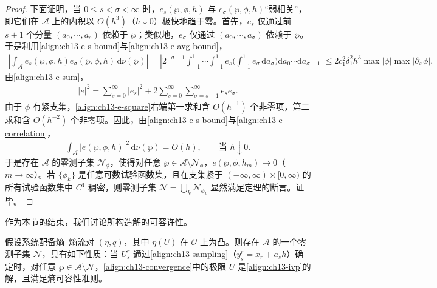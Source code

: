 \documentclass[../../main.tex]{subfiles}
\begin{document}
\begin{proof}
下面证明，当 $0\leqslant s<\sigma<\infty$ 时，$e_s(\wp,\phi,h)$ 与 $e_\sigma(\wp,\phi,h)$``弱相关''，即它们在 $\mathscr{A}$ 上的内积以 $O(h^3)$（$h\downarrow0$）极快地趋于零。首先，$e_s$ 仅通过前 $s+1$ 个分量 $(a_0,\cdots,a_s)$ 依赖于 $\wp$；类似地，$e_\sigma$ 仅通过 $(a_0,\cdots,a_\sigma)$ 依赖于 $\wp$。于是利用\eqref{align:ch13-e-s-bound}与\eqref{align:ch13-e-avg-bound}，
\begin{align}
\left|\int_{\mathscr{A}}e_s(\wp,\phi,h)e_\sigma(\wp,\phi,h)\,\mathrm{d}\nu(\wp)\right|
=\left|2^{-\sigma-1}\int_{-1}^1\cdots\int_{-1}^1 e_s\Big(\int_{-1}^1 e_\sigma\,\mathrm{d}a_\sigma\Big)\mathrm{d}a_0\cdots\mathrm{d}a_{\sigma-1}\right|
\leqslant 2c_1^2\delta_1^2 h^3\max|\phi|\max|\partial_x\phi|.
\label{align:ch13-e-correlation}
\end{align}
由\eqref{align:ch13-e-sum}，
\begin{align}
|e|^2=\sum_{s=0}^\infty|e_s|^2+2\sum_{s=0}^\infty\sum_{\sigma=s+1}^\infty e_s e_\sigma.
\label{align:ch13-e-square}
\end{align}
由于 $\phi$ 有紧支集，\eqref{align:ch13-e-square}右端第一求和含 $O(h^{-1})$ 个非零项，第二求和含 $O(h^{-2})$ 个非零项。因此，由\eqref{align:ch13-e-s-bound}与\eqref{align:ch13-e-correlation}，
\begin{align}
\int_{\mathscr{A}}|e(\wp,\phi,h)|^2\,\mathrm{d}\nu(\wp)=O(h),\qquad\text{当 }h\downarrow0.
\label{align:ch13-e-square-avg}
\end{align}
于是存在 $\mathscr{A}$ 的零测子集 $\mathscr{N}_\phi$，使得对任意 $\wp\in\mathscr{A}\setminus\mathscr{N}_\phi$，$e(\wp,\phi,h_m)\to0$（$m\to\infty$）。若 $\{\phi_k\}$ 是任意可数试验函数集，且在支集紧于 $(-\infty,\infty)\times[0,\infty)$ 的所有试验函数集中 $C^1$ 稠密，则零测子集 $\mathscr{N}=\bigcup_k\mathscr{N}_{\phi_k}$ 显然满足定理的断言。证毕。
\end{proof}

作为本节的结束，我们讨论所构造解的可容许性。

\begin{theorem}[熵可容许性]\label{theorem:ch13-熵可容性}
假设系统配备熵--熵流对 $(\eta,q)$，其中 $\eta(U)$ 在 $\mathcal{O}$ 上为凸。则存在 $\mathscr{A}$ 的一个零测子集 $\mathscr{N}$，具有如下性质：当 $U_s^r$ 通过\eqref{align:ch13-sampling}（$y_s^r=x_r+a_s h$）确定时，对任意 $\wp\in\mathscr{A}\setminus\mathscr{N}$，\eqref{align:ch13-convergence}中的极限 $U$ 是\eqref{align:ch13-ivp}的解，且满足熵可容性准则。
\end{theorem}
\end{document}
